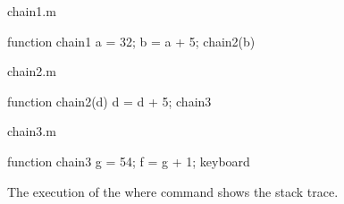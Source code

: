 \begin{DoxyVerb}     chain1.m
\end{DoxyVerb}



\begin{DoxyVerbInclude}
function chain1
  a = 32;
  b = a + 5;
  chain2(b)
\end{DoxyVerbInclude}


\begin{DoxyVerb}     chain2.m
\end{DoxyVerb}



\begin{DoxyVerbInclude}
function chain2(d)
  d = d + 5;
  chain3
\end{DoxyVerbInclude}


\begin{DoxyVerb}     chain3.m
\end{DoxyVerb}



\begin{DoxyVerbInclude}
function chain3
  g = 54;
  f = g + 1;
  keyboard
\end{DoxyVerbInclude}


The execution of the {\ttfamily where} command shows the stack trace.



